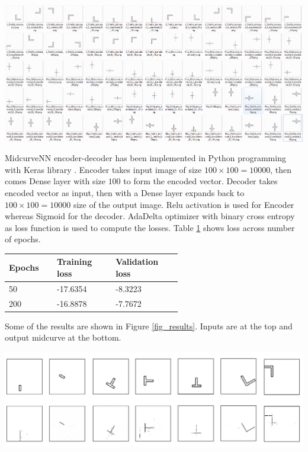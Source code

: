 \documentclass[10pt,twocolumn,letterpaper]{article}
\begin{document}
     \begin{center}
	\includegraphics[width=\linewidth]{images/training_data}
	\label{fig_training}
    \end{center}
    
MidcurveNN encoder-decoder has been implemented in Python programming with Keras library \cite{autoenkeras}.  Encoder takes input image of size $100 \times 100 = 10000$, then comes Dense layer with size $100$ to form the encoded vector. Decoder takes encoded vector as input, then with a Dense layer expands back to $100 \times 100 = 10000$ size of the output image. Relu activation is used for Encoder whereas Sigmoid for the decoder. AdaDelta optimizer with binary cross entropy as loss function is used to compute the losses. Table \ref{tbl_loss} shows loss across number of epochs.    


\begin{table}
\centering

\begin{tabular}[htbp]{@{} p{0.14\linewidth}  p{0.22\linewidth}  p{0.22\linewidth}  @{}} \toprule
{\bf Epochs } & {\bf Training loss }  & {\bf Validation loss} \\
\midrule
50	& -17.6354	& -8.3223\\
200	& -16.8878	& -7.7672 \\
\bottomrule
\end{tabular}
\label{tbl_loss}
\end{table}


Some of the results are shown in Figure \ref{fig_results}. Inputs are at the top and output midcurve at the bottom.

     \begin{center}
	\includegraphics[width=\linewidth]{images/midcurvenn_results}
	\label{fig_results}
    \end{center}
\end{document}

